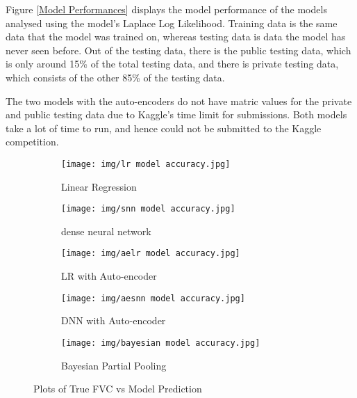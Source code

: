 \documentclass[12pt]{article}
\begin{document}
Figure \ref{Model Performances} displays the model performance of the models analysed using the model's Laplace Log Likelihood.
Training data is the same data that the model was trained on, whereas testing data is data the model has never seen before. 
Out of the testing data, there is the public testing data, which is only around 15\% of the total testing data, and there is private testing data, which consists of the other 85\% of the testing data.

The two models with the auto-encoders do not have matric values for the private and public testing data due to Kaggle's time limit for submissions.
Both models take a lot of time to run, and hence could not be submitted to the Kaggle competition.

\begin{figure}[h!]
    \centering

    \begin{subfigure}{.32\textwidth}
        \centering
        \texttt{[image: img/lr model accuracy.jpg]}
        \caption{Linear Regression}
        \label{accuracy:lr}
    \end{subfigure}
    \begin{subfigure}{.32\textwidth}
        \centering
        \texttt{[image: img/snn model accuracy.jpg]}
        \caption{dense neural network}
        \label{accuracy:dnn}
    \end{subfigure}
    \begin{subfigure}{.32\textwidth}
        \centering
        \texttt{[image: img/aelr model accuracy.jpg]}
        \caption{LR with Auto-encoder}
        \label{accuracy:aelr}
    \end{subfigure}

    \vspace{0.5em}

    \begin{subfigure}{.33\textwidth}
        \centering
        \texttt{[image: img/aesnn model accuracy.jpg]}
        \caption{DNN with Auto-encoder}
        \label{accuracy:aednn}
    \end{subfigure}
    \begin{subfigure}{.33\textwidth}
        \centering
        \texttt{[image: img/bayesian model accuracy.jpg]}
        \caption{Bayesian Partial Pooling}
        \label{accuracy:bpp}
    \end{subfigure}

    \caption{Plots of True FVC vs Model Prediction}
    \label{accuracy graphs}
\end{figure}
\end{document}

